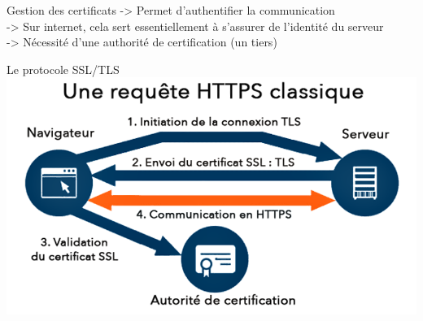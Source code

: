 
\begin{frame}{Gestion des certificats}
  -> Permet d'authentifier la communication \\
  -> Sur internet, cela sert essentiellement à s'assurer de l'identité du serveur \\
  -> Nécessité d'une authorité de certification (un tiers) \\
\end{frame}


\begin{frame}{Le protocole SSL/TLS}
  \includegraphics[width=\linewidth]{../medias/protocole-tls.png}
\end{frame}
